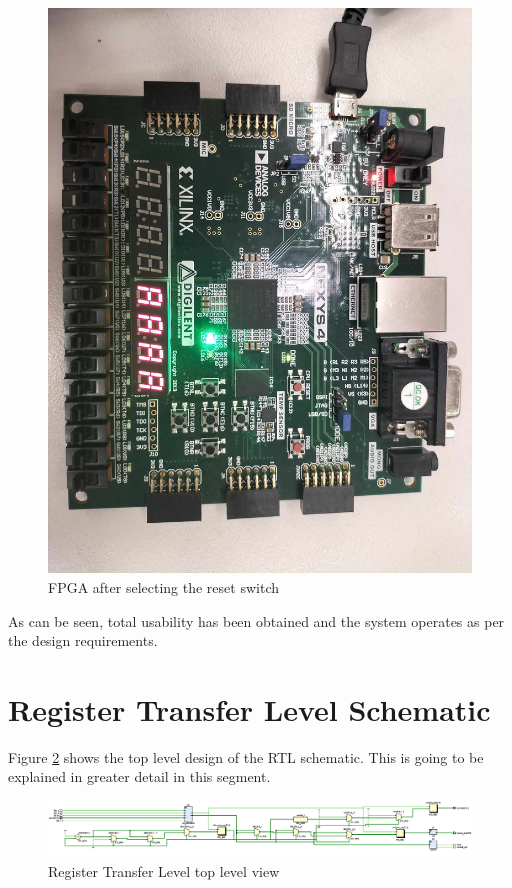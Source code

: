 \documentclass[12pt,a4paper]{article}
\begin{document}
\begin{figure}[H]
    \centering
    \includegraphics[scale=0.25]{images/fpga_reset.jpg}
    \caption{FPGA after selecting the reset switch}
    \label{fig:fpga_reset}
\end{figure}

As can be seen, total usability has been obtained and the system operates as per the design requirements.

\section{Register Transfer Level Schematic}

Figure \ref{fig:rtl} shows the top level design of the RTL schematic. This is going to be explained in greater detail in this segment.

\begin{figure}[H]
    \centering
    \includegraphics[scale=0.25]{images/rtl.png}
    \caption{Register Transfer Level top level view}
    \label{fig:rtl}
\end{figure}
\end{document}
